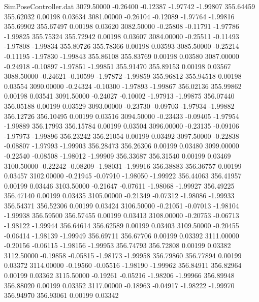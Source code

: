\begin{filecontents}{SimPoseController.dat}
3079.50000   -0.26400   -0.12387    -1.97742   -1.99807  355.64459  355.62032    0.00198    0.03634
3081.00000   -0.26104   -0.12089    -1.97764   -1.99816  355.69902  355.67497    0.00198    0.03620
3082.50000   -0.25808   -0.11791    -1.97786   -1.99825  355.75324  355.72942    0.00198    0.03607
3084.00000   -0.25511   -0.11493    -1.97808   -1.99834  355.80726  355.78366    0.00198    0.03593
3085.50000   -0.25214   -0.11195    -1.97830   -1.99843  355.86108  355.83769    0.00198    0.03580
3087.00000   -0.24918   -0.10897    -1.97851   -1.99851  355.91470  355.89153    0.00198    0.03567
3088.50000   -0.24621   -0.10599    -1.97872   -1.99859  355.96812  355.94518    0.00198    0.03554
3090.00000   -0.24324   -0.10300    -1.97893   -1.99867  356.02136  355.99862    0.00198    0.03541
3091.50000   -0.24027   -0.10002    -1.97913   -1.99875  356.07440  356.05188    0.00199    0.03529
3093.00000   -0.23730   -0.09703    -1.97934   -1.99882  356.12726  356.10495    0.00199    0.03516
3094.50000   -0.23433   -0.09405    -1.97954   -1.99889  356.17993  356.15784    0.00199    0.03504
3096.00000   -0.23135   -0.09106    -1.97973   -1.99896  356.23242  356.21054    0.00199    0.03492
3097.50000   -0.22838   -0.08807    -1.97993   -1.99903  356.28473  356.26306    0.00199    0.03480
3099.00000   -0.22540   -0.08508    -1.98012   -1.99909  356.33687  356.31540    0.00199    0.03469
3100.50000   -0.22242   -0.08209    -1.98031   -1.99916  356.38883  356.36757    0.00199    0.03457
3102.00000   -0.21945   -0.07910    -1.98050   -1.99922  356.44063  356.41957    0.00199    0.03446
3103.50000   -0.21647   -0.07611    -1.98068   -1.99927  356.49225  356.47140    0.00199    0.03435
3105.00000   -0.21349   -0.07312    -1.98086   -1.99933  356.54371  356.52306    0.00199    0.03424
3106.50000   -0.21051   -0.07013    -1.98104   -1.99938  356.59500  356.57455    0.00199    0.03413
3108.00000   -0.20753   -0.06713    -1.98122   -1.99944  356.64614  356.62589    0.00199    0.03403
3109.50000   -0.20455   -0.06414    -1.98139   -1.99949  356.69711  356.67706    0.00199    0.03392
3111.00000   -0.20156   -0.06115    -1.98156   -1.99953  356.74793  356.72808    0.00199    0.03382
3112.50000   -0.19858   -0.05815    -1.98173   -1.99958  356.79860  356.77894    0.00199    0.03372
3114.00000   -0.19560   -0.05516    -1.98190   -1.99962  356.84911  356.82964    0.00199    0.03362
3115.50000   -0.19261   -0.05216    -1.98206   -1.99966  356.89948  356.88020    0.00199    0.03352
3117.00000   -0.18963   -0.04917    -1.98222   -1.99970  356.94970  356.93061    0.00199    0.03342

\end{filecontents}
